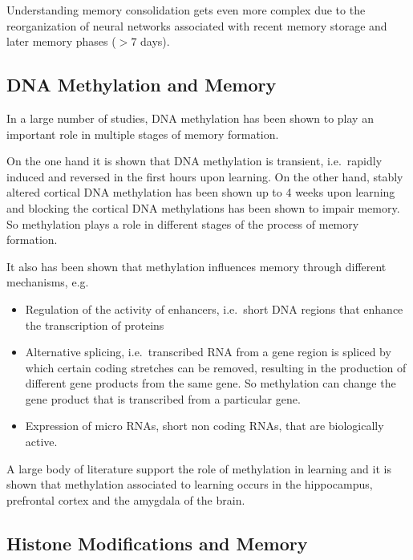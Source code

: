 \documentclass[
  11pt,
]{book}
\providecommand{\tightlist}{%
  \setlength{\itemsep}{0pt}\setlength{\parskip}{0pt}}
\begin{document}
Understanding memory consolidation gets even more complex due to the reorganization of neural networks associated with recent memory storage and later memory phases (\(>7\) days).

\hypertarget{dna-methylation-and-memory}{%
\subsection{DNA Methylation and Memory}\label{dna-methylation-and-memory}}

In a large number of studies, DNA methylation has been shown to play an important role in multiple stages of memory formation.

On the one hand it is shown that DNA methylation is transient, i.e.~rapidly induced and reversed in the first hours upon learning. On the other hand, stably altered cortical DNA methylation has been shown up to 4 weeks upon learning and blocking the cortical DNA methylations has been shown to impair memory.
So methylation plays a role in different stages of the process of memory formation.

It also has been shown that methylation influences memory through different mechanisms, e.g.~

\begin{itemize}
\tightlist
\item
  Regulation of the activity of enhancers, i.e.~short DNA regions that enhance the transcription of proteins
\item
  Alternative splicing, i.e.~transcribed RNA from a gene region is spliced by which certain coding stretches can be removed, resulting in the production of different gene products from the same gene. So methylation can change the gene product that is transcribed from a particular gene.
\item
  Expression of micro RNAs, short non coding RNAs, that are biologically active.
\end{itemize}

A large body of literature support the role of methylation in learning and it is shown that methylation associated to learning occurs in the hippocampus, prefrontal cortex and the amygdala of the brain.

\hypertarget{histone-modifications-and-memory}{%
\subsection{Histone Modifications and Memory}\label{histone-modifications-and-memory}}
\end{document}
